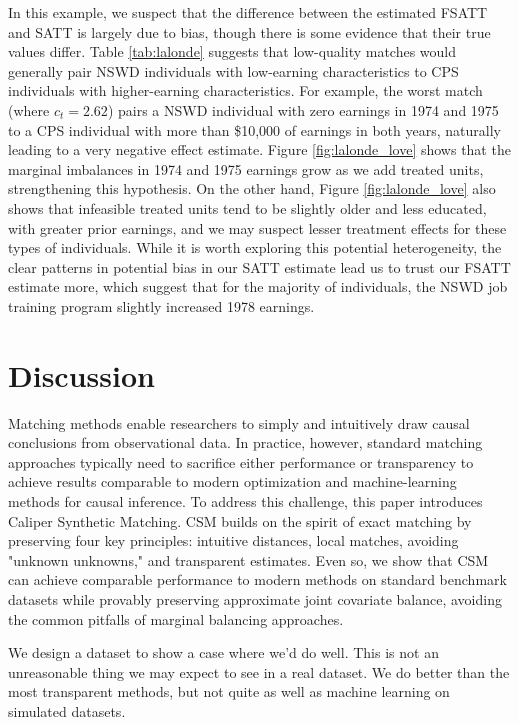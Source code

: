 \documentclass{article}
\begin{document}
In this example, we suspect that the difference between the estimated FSATT and SATT is largely due to bias, though there is some evidence that their true values differ.
Table \ref{tab:lalonde} suggests that low-quality matches would generally pair NSWD individuals with low-earning characteristics to CPS individuals with higher-earning characteristics.
For example, the worst match (where $c_t = 2.62$) pairs a NSWD individual with zero earnings in 1974 and 1975 to a CPS individual with more than \$10,000 of earnings in both years, naturally leading to a very negative effect estimate.
Figure \ref{fig:lalonde_love} shows that the marginal imbalances in 1974 and 1975 earnings grow as we add treated units, strengthening this hypothesis.
On the other hand, Figure \ref{fig:lalonde_love} also shows that infeasible treated units tend to be slightly older and less educated, with greater prior earnings, and we may suspect lesser treatment effects for these types of individuals.
While it is worth exploring this potential heterogeneity, the clear patterns in potential bias in our SATT estimate lead us to trust our FSATT estimate more, which suggest that for the majority of individuals, the NSWD job training program slightly increased 1978 earnings.


\section{Discussion}

Matching methods enable researchers to simply and intuitively draw causal conclusions from observational data.
In practice, however, standard matching approaches typically need to sacrifice either performance or transparency to achieve results comparable to modern optimization and machine-learning methods for causal inference.
To address this challenge, this paper introduces Caliper Synthetic Matching.
CSM builds on the spirit of exact matching by preserving four key principles: intuitive distances, local matches, avoiding "unknown unknowns," and transparent estimates.
Even so, we show that CSM can achieve comparable performance to modern methods on standard benchmark datasets while provably preserving approximate joint covariate balance, avoiding the common pitfalls of marginal balancing approaches.

We design a dataset to show a case where we'd do well.
This is not an unreasonable thing we may expect to see in a real dataset.
We do better than the most transparent methods, but not quite as well as machine learning on simulated datasets.
\end{document}
